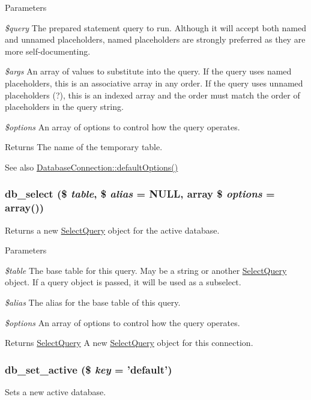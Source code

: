 \begin{DoxyParams}{Parameters}
\item[{\em \$query}]The prepared statement query to run. Although it will accept both named and unnamed placeholders, named placeholders are strongly preferred as they are more self-\/documenting. \item[{\em \$args}]An array of values to substitute into the query. If the query uses named placeholders, this is an associative array in any order. If the query uses unnamed placeholders (?), this is an indexed array and the order must match the order of placeholders in the query string. \item[{\em \$options}]An array of options to control how the query operates.\end{DoxyParams}
\begin{DoxyReturn}{Returns}
The name of the temporary table.
\end{DoxyReturn}
\begin{DoxySeeAlso}{See also}
\hyperlink{classDatabaseConnection_a190539d6c494ef2d7ac90d21226de5a5}{DatabaseConnection::defaultOptions()} 
\end{DoxySeeAlso}
\hypertarget{group__database_ga9e030cee657d64e3d8e524c65814cc9f}{
\subsubsection[{db\_\-select}]{\setlength{\rightskip}{0pt plus 5cm}db\_\-select (\$ {\em table}, \/  \$ {\em alias} = {\ttfamily NULL}, \/  array \$ {\em options} = {\ttfamily array()})}}
\label{group__database_ga9e030cee657d64e3d8e524c65814cc9f}
Returns a new \hyperlink{classSelectQuery}{SelectQuery} object for the active database.


\begin{DoxyParams}{Parameters}
\item[{\em \$table}]The base table for this query. May be a string or another \hyperlink{classSelectQuery}{SelectQuery} object. If a query object is passed, it will be used as a subselect. \item[{\em \$alias}]The alias for the base table of this query. \item[{\em \$options}]An array of options to control how the query operates.\end{DoxyParams}
\begin{DoxyReturn}{Returns}
\hyperlink{classSelectQuery}{SelectQuery} A new \hyperlink{classSelectQuery}{SelectQuery} object for this connection. 
\end{DoxyReturn}
\hypertarget{group__database_ga954d1bbb12742f285927e43f9489fdaf}{
\subsubsection[{db\_\-set\_\-active}]{\setlength{\rightskip}{0pt plus 5cm}db\_\-set\_\-active (\$ {\em key} = {\ttfamily 'default'})}}
\label{group__database_ga954d1bbb12742f285927e43f9489fdaf}
Sets a new active database.


